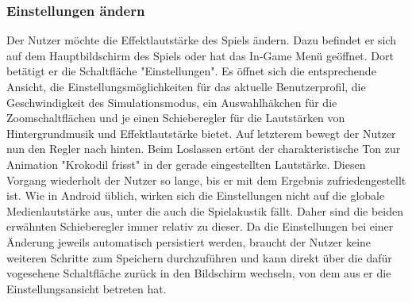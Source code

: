 \subsubsection{Einstellungen ändern}
Der Nutzer möchte die Effektlautstärke des Spiels ändern. Dazu befindet
er sich auf dem Hauptbildschirm des Spiels oder hat das In-Game Menü 
geöffnet. Dort betätigt er die Schaltfläche "Einstellungen".
Es öffnet sich die entsprechende Ansicht, die Einstellungsmöglichkeiten
für das aktuelle Benutzerprofil, die Geschwindigkeit des Simulationsmodus,
ein Auswahlhäkchen für die Zoomschaltflächen und je einen Schieberegler
für die Lautstärken von Hintergrundmusik und Effektlautstärke bietet.
Auf letzterem bewegt der Nutzer nun den Regler nach hinten. Beim Loslassen
ertönt der charakteristische Ton zur Animation "Krokodil frisst" in der
gerade eingestellten Lautstärke. Diesen Vorgang wiederholt der Nutzer
so lange, bis er mit dem Ergebnis zufriedengestellt ist. Wie in Android 
üblich, wirken sich die Einstellungen nicht auf die globale Medienlautstärke
aus, unter die auch die Spielakustik fällt. Daher sind die beiden erwähnten
Schieberegler immer relativ zu dieser. Da die Einstellungen
bei einer Änderung jeweils automatisch persistiert werden, braucht der
Nutzer keine weiteren Schritte zum Speichern durchzuführen und kann
direkt über die dafür vogesehene Schaltfläche zurück in den Bildschirm
wechseln, von dem aus er die Einstellungsansicht betreten hat.

